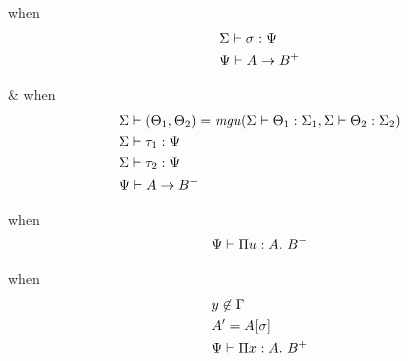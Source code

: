                         {}
when 
\begin{align*} 
  &\Sigma\vdash \sigma:\Psi\\
  &\Psi\vdash A \to B^+
\end{align*} 

                       { & }
when
\begin{align*} 
  &\Sigma\vdash (\Theta_1,\Theta_2) = \mathit{mgu}(\Sigma\vdash \Theta_1:\Sigma_1,\Sigma\vdash \Theta_2:\Sigma_2)\\
  &\Sigma\vdash \tau_1:\Psi\\
  &\Sigma\vdash \tau_2:\Psi\\
  &\Psi\vdash A \to B^-
\end{align*} 

                    {}
when 
\begin{align*} 
  \Psi\vdash \Pi u : A.\ B^-
\end{align*} 

                    {}

when 
\begin{align*} 
  &y\not\in \Gamma \\
  &A' = A[\sigma] \\
  &\Psi\vdash \Pi x : A.\ B^+
\end{align*} 







